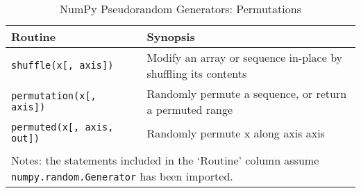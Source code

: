 \documentclass[a4paper,11pt]{book}
\numberwithin{figure}{chapter}
\numberwithin{table}{chapter}
\begin{document}
\begin{sidewaystable}[!htbp]
	\centering
	\caption{NumPy Pseudorandom Generators: Permutations} 
	\label{tab:random_permutations}
	\begin{tabular}{ll}
		\toprule \toprule
			Routine & Synopsis \\
			\midrule
			\texttt{shuffle(x[, axis])} &
                        Modify an array or sequence in-place by shuffling its contents\\
                        \texttt{permutation(x[, axis])} &
                        Randomly permute a sequence, or return a permuted range\\
                        \texttt{permuted(x[, axis, out])} &
                        Randomly permute x along axis axis\\
	     	\bottomrule \\[-1.8ex]
	        \multicolumn{2}{l}{Notes: the statements included in the `Routine' column assume \texttt{numpy.random.Generator} has been imported.} \\
	\end{tabular}
\end{sidewaystable}
\end{document}
